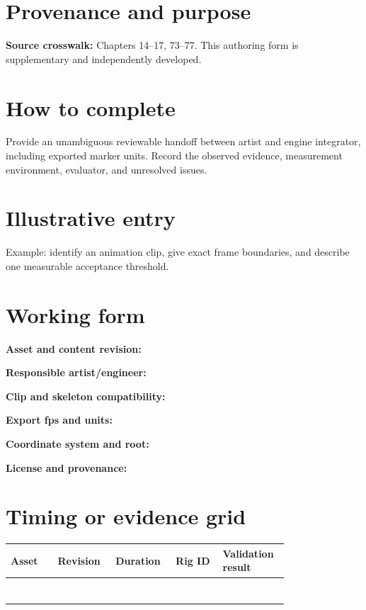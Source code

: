 \documentclass[10pt,letterpaper]{article}
\begin{document}
\makedoctitle
\makedocsummary

\section{Provenance and purpose}
\textbf{Source crosswalk:} Chapters 14--17, 73--77. This authoring form is supplementary and independently developed.
\section{How to complete}
Provide an unambiguous reviewable handoff between artist and engine integrator, including exported marker units. Record the observed evidence, measurement environment, evaluator, and unresolved issues. 
\section{Illustrative entry}
Example: identify an animation clip, give exact frame boundaries, and describe one measurable acceptance threshold.
\section{Working form}
\noindent\textbf{Asset and content revision:}\quad\hrulefill\par\vspace{10pt}
\noindent\textbf{Responsible artist/engineer:}\quad\hrulefill\par\vspace{10pt}
\noindent\textbf{Clip and skeleton compatibility:}\quad\hrulefill\par\vspace{10pt}
\noindent\textbf{Export fps and units:}\quad\hrulefill\par\vspace{10pt}
\noindent\textbf{Coordinate system and root:}\quad\hrulefill\par\vspace{10pt}
\noindent\textbf{License and provenance:}\quad\hrulefill\par\vspace{10pt}\section{Timing or evidence grid}
\begin{longtable}{|p{0.156\linewidth}|p{0.156\linewidth}|p{0.156\linewidth}|p{0.156\linewidth}|p{0.156\linewidth}|}
\hline
\textbf{Asset} & \textbf{Revision} & \textbf{Duration} & \textbf{Rig ID} & \textbf{Validation result}\\\hline
\endhead
\rule{0pt}{20pt} &  &  &  & \\\hline
\rule{0pt}{20pt} &  &  &  & \\\hline
\rule{0pt}{20pt} &  &  &  & \\\hline
\rule{0pt}{20pt} &  &  &  & \\\hline
\rule{0pt}{20pt} &  &  &  & \\\hline
\rule{0pt}{20pt} &  &  &  & \\\hline
\rule{0pt}{20pt} &  &  &  & \\\hline
\end{longtable}
\end{document}
